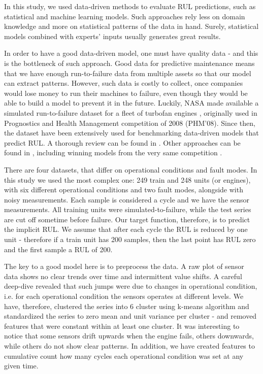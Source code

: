 \documentclass[letterpaper, 10 pt, conference, onecolumn]{ieeeconf}  %
\begin{document}
In this study, we used data-driven methods to evaluate RUL predictions, such as statistical and machine learning models. Such approaches rely less on domain knowledge and more on statistical patterns of the data in hand. Surely, statistical models combined with experts' inputs usually generates great results.

In order to have a good data-driven model, one must have quality data - and this is the bottleneck of such approach. Good data for predictive maintenance means that we have enough run-to-failure data from multiple assets so that our model can extract patterns. However, such data is costly to collect, once companies would lose money to run their machines to failure, even though they would be able to build a model to prevent it in the future. Luckily, NASA made available a simulated run-to-failure dataset for a fleet of turbofan engines \cite{frederick2007user, saxena2008damage}, originally used in Prognostics and Health Management competition of 2008 (PHM'08). Since then, the dataset have been extensively used for benchmarking data-driven models that predict RUL. A thorough review can be found in \cite{ramasso2014review, ramasso2014performance}. Other approaches can be found in \cite{gugulothu2017predicting, hu2012ensemble, mosallam2014data, sarkar2011data}, including winning models from the very same competition \cite{heimes2008recurrent, wang2008similarity}.

There are four datasets, that differ on operational conditions and fault modes. In this study we used the most complex one: 249 train and 248 units (or engines), with six different operational conditions and two fault modes, alongside with noisy measurements. Each sample is considered a cycle and we have the sensor measurements. All training units were simulated-to-failure, while the test series are cut off sometime before failure. Our target function, therefore, is to predict the implicit RUL. We assume that after each cycle the RUL is reduced by one unit - therefore if a train unit has 200 samples, then the last point has RUL zero and the first sample a RUL of 200.

The key to a good model here is to preprocess the data. A raw plot of sensor data shows no clear trends over time and intermittent value shifts. A careful deep-dive revealed that such jumps were due to changes in operational condition, i.e. for each operational condition the sensors operates at different levels. We have, therefore, clustered the series into 6 cluster using k-means algorithm and standardized the series to zero mean and unit variance per cluster - and removed features that were constant within at least one cluster. It was interesting to notice that some sensors drift upwards when the engine fails, others downwards, while others do not show clear patterns. In addition, we have created features to cumulative count how many cycles each operational condition was set at any given time.
\end{document}
